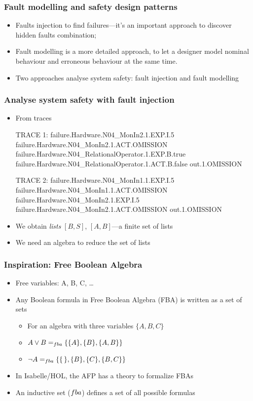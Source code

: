 

\begin{frame}
\frametitle{Fault modelling and safety design patterns}
\begin{itemize}
  \item Faults injection to find failures---it's an important approach to discover hidden faults combination;
  \item Fault modelling is a more detailed approach, to let a designer model nominal behaviour and erroneous behaviour at the same time.
  \item Two approaches analyse system safety: fault injection and fault modelling 
\end{itemize}
\end{frame}

\begin{frame}[fragile]
\frametitle{Analyse system safety with fault injection}

\begin{itemize}
  \item From traces
\begin{snippetcspm}[0]
TRACE 1:
failure.Hardware.N04_MonIn2.1.EXP.I.5
failure.Hardware.N04_MonIn2.1.ACT.OMISSION
failure.Hardware.N04_RelationalOperator.1.EXP.B.true
failure.Hardware.N04_RelationalOperator.1.ACT.B.false
out.1.OMISSION

TRACE 2:
failure.Hardware.N04_MonIn1.1.EXP.I.5
failure.Hardware.N04_MonIn1.1.ACT.OMISSION
failure.Hardware.N04_MonIn2.1.EXP.I.5
failure.Hardware.N04_MonIn2.1.ACT.OMISSION
out.1.OMISSION
\end{snippetcspm}
  \item We obtain \emph{lists} $[B,S]$, $[A,B]$---a finite set of lists
  \item We need an algebra to reduce the set of lists 
\end{itemize}
\end{frame}

\begin{frame}
\frametitle{Inspiration: Free Boolean Algebra}
\begin{itemize}
  \item Free variables: A, B, C, \ldots
  \item Any Boolean formula in Free Boolean Algebra (FBA) is written as a set of sets
    \begin{itemize}
      \item For an algebra with three variables $\{A,B,C\}$
      \item $A \lor B =_{fba} \{ \{A\}, \{B\}, \{A,B\}  \}$
      \item $\lnot A =_{fba} \{ \{\,\}, \{B\},\{C\},\{B,C\}  \} $
    \end{itemize}  
  \item In Isabelle/HOL, the AFP has a theory to formalize FBAs
  \item An inductive set ($fba$) defines a set of all possible formulas

\end{itemize}
\end{frame}

